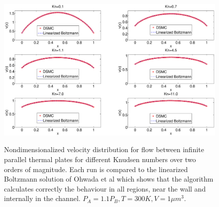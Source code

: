 \begin{figure}[h]
\includegraphics[width=\textwidth, trim=6cm 0cm 5cm 0cm, clip]{DSMC/figures/validation_poiseuille.eps}
\label{fig:dsmc_validation_poiseuille}
\centering
\caption{Nondimensionalized velocity distribution for flow between infinite parallel thermal plates for different Knudsen numbers over two orders of magnitude. Each run is compared to the linearized Boltzmann solution of Ohwada et al\cite{ohwada1989numerical} which shows that the algorithm calculates correctly the behaviour in all regions, near the wall and internally in the channel. $P_A = 1.1P_B, T=300K, V=1\mu m^3$.}
\end{figure}